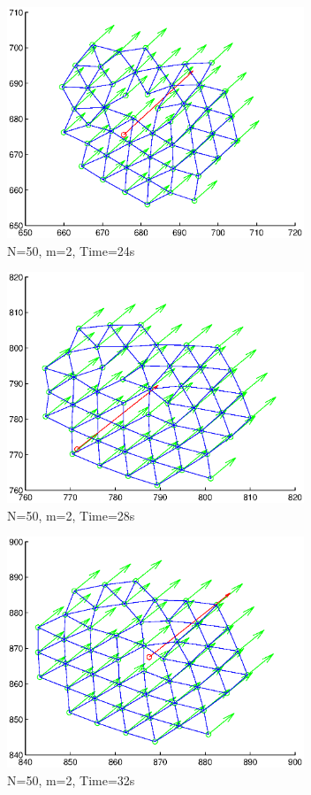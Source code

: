 \documentclass[10pt, conference, compsocconf]{IEEEtran}
\begin{document}
\begin{figure}[!p]
  \begin{center}
    \includegraphics[width=3.5in]{n50m2t24}
  \end{center}

  \caption{\small N=50, m=2, Time=24s}
  \label{fig:n50m2t24}
\end{figure}

\begin{figure}[!p]
  \begin{center}
    \includegraphics[width=3.5in]{n50m2t28}
  \end{center}

  \caption{\small N=50, m=2, Time=28s}
  \label{fig:n50m2t28}
\end{figure}

\begin{figure}[!p]
  \begin{center}
    \includegraphics[width=3.5in]{n50m2t32}
  \end{center}

  \caption{\small N=50, m=2, Time=32s}
  \label{fig:n50m2t32}
\end{figure}
\end{document}
